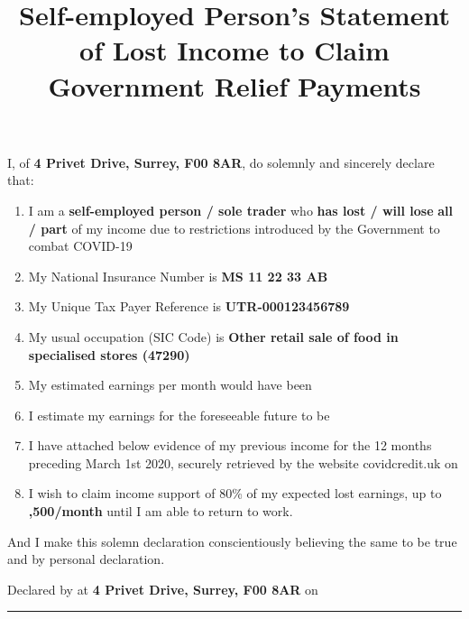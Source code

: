 \documentclass[12pt]{article}
\title{Self-employed Person's Statement of Lost Income to Claim Government Relief Payments}
\begin{document}
\selectfont

\maketitle

I, \textbf{} of \textbf{4 Privet Drive, Surrey, F00 8AR}, do solemnly and sincerely declare that: 

\vspace{12pt}

\begin{enumerate}
  \item I am a \textbf{self-employed person / sole trader} who \textbf{has lost / will lose} \textbf{all / part} of my income due to restrictions introduced by the Government to combat COVID-19
  \item My National Insurance Number is \textbf{MS 11 22 33 AB}
  \item My Unique Tax Payer Reference is \textbf{UTR-000123456789}
  \item My usual occupation (SIC Code) is \textbf{Other retail sale of food in specialised stores (47290)}
  \item My estimated earnings per month would have been \textbf{\textsterling {}}
  \item I estimate my earnings for the foreseeable future to be \textbf{}
  \item I have attached below evidence of my previous income for the 12 months preceding March 1st 2020, securely retrieved by the website covidcredit.uk on \textbf{}
  \item I wish to claim income support of 80\% of my expected lost earnings, up to \textbf{,500/month} until I am able to return to work.
\end{enumerate}

\vspace{12pt}

And I make this solemn declaration conscientiously believing the same to be true and by personal declaration.

\vspace{36pt}

Declared by \textbf{} at \textbf{4 Privet Drive, Surrey, F00 8AR} on \textbf{}

\vspace{18pt}

\rule{\textwidth}{0.4pt}

\pagebreak
\end{document}
